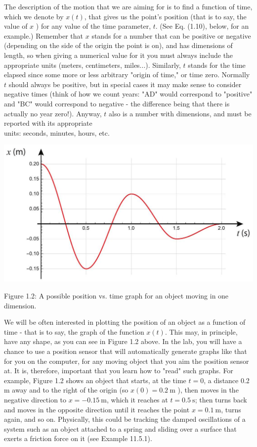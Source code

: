 \documentclass[10pt]{article}
\begin{document}
The description of the motion that we are aiming for is to find a function of time, which we denote by $x(t)$, that gives us the point's position (that is to say, the value of $x$ ) for any value of the time parameter, $t$. (See Eq. (1.10), below, for an example.) Remember that $x$ stands for a number that can be positive or negative (depending on the side of the origin the point is on), and has dimensions of length, so when giving a numerical value for it you must always include the appropriate units (meters, centimeters, miles...). Similarly, $t$ stands for the time elapsed since some more or less arbitrary "origin of time," or time zero. Normally $t$ should always be positive, but in special cases it may make sense to consider negative times (think of how we count years: "AD" would correspond to "positive" and "BC" would correspond to negative - the difference being that there is actually no year zero!). Anyway, $t$ also is a number with dimensions, and must be reported with its appropriate\\
units: seconds, minutes, hours, etc.

\begin{center}
\includegraphics[max width=\textwidth]{2024_09_14_9969b06773f10b6936e8g-024}
\end{center}

Figure 1.2: A possible position vs. time graph for an object moving in one dimension.

We will be often interested in plotting the position of an object as a function of time - that is to say, the graph of the function $x(t)$. This may, in principle, have any shape, as you can see in Figure 1.2 above. In the lab, you will have a chance to use a position sensor that will automatically generate graphs like that for you on the computer, for any moving object that you aim the position sensor at. It is, therefore, important that you learn how to "read" such graphs. For example, Figure 1.2 shows an object that starts, at the time $t=0$, a distance 0.2 m away and to the right of the origin (so $x(0)=0.2 \mathrm{~m}$ ), then moves in the negative direction to $x=-0.15 \mathrm{~m}$, which it reaches at $t=0.5 \mathrm{~s}$; then turns back and moves in the opposite direction until it reaches the point $x=0.1 \mathrm{~m}$, turns again, and so on. Physically, this could be tracking the damped oscillations of a system such as an object attached to a spring and sliding over a surface that exerts a friction force on it (see Example 11.5.1).
\end{document}
